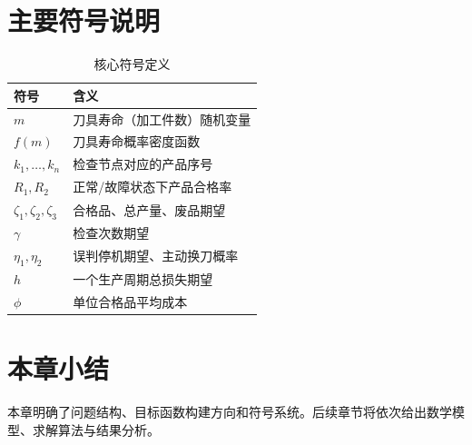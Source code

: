 \section{主要符号说明}
\begin{table}[H]
\centering
\caption{核心符号定义}
\begin{tabular}{ll}
\toprule
符号 & 含义 \\
\midrule
$m$ & 刀具寿命（加工件数）随机变量 \\
$f(m)$ & 刀具寿命概率密度函数 \\
$k_1,\ldots,k_n$ & 检查节点对应的产品序号 \\
$R_1,R_2$ & 正常/故障状态下产品合格率 \\
$\zeta_1,\zeta_2,\zeta_3$ & 合格品、总产量、废品期望 \\
$\gamma$ & 检查次数期望 \\
$\eta_1,\eta_2$ & 误判停机期望、主动换刀概率 \\
$h$ & 一个生产周期总损失期望 \\
$\phi$ & 单位合格品平均成本 \\
\bottomrule
\end{tabular}
\end{table}

\section{本章小结}
本章明确了问题结构、目标函数构建方向和符号系统。后续章节将依次给出数学模型、求解算法与结果分析。
